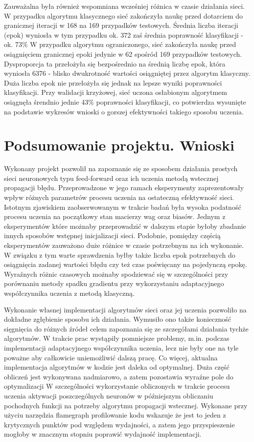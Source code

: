 \documentclass[12pt,twoside]{article}
\begin{document}
Zauważalna była również wspomniana wcześniej różnica w czasie działania sieci.
W przypadku algorytmu klasycznego sieć zakończyła naukę przed dotarciem do granicznej iteracji w 168 na 169 przypadków testowych.
Średnia liczba iteracji (epok) wyniosła w tym przypadku  ok. 372 zaś średnia poprawność klasyfikacji - ok. 73\%
W przypadku algorytmu ograniczonego, sieć zakończyła naukę przed osiągnięciem granicznej epoki jedynie w 62 spośród 169 przypadków testowych.
Dysproporcja ta przełożyła się bezpośrednio na średnią liczbę epok, która wyniosła 6376 - blisko dwukrotność wartości osiągniętej przez algorytm klasyczny.
Duża liczba epok nie przełożyła się jednak na lepsze wyniki poprawności klasyfikacji.
Przy walidacji krzyżowej, sieć uczona osłabionym algorytmem osiągnęła śrendnio  jednie 43\% poprawności klasyfikacji, co potwierdza wysunięte na podstawie wykresów wnioski o gorszej efektywności takiego sposobu uczenia.

\clearpage

\section{Podsumowanie projektu. Wnioski}
Wykonany projekt pozwolił na zapoznanie się ze sposobem działania prostych sieci neuronowych typu feed-forward oraz ich uczenia metodą  wstecznej propagacji błędu.
Przeprowadzone w jego ramach eksperymenty zaprezentowały wpływ różnych parametrów procesu uczenia na ostateczną efektywność sieci.
Istotnym zjawiskiem zaobserwowanym w trakcie badań była wysoka podatność procesu uczenia na początkowy stan macierzy wag oraz biasów.
Jednym z eksperymentów które możnaby przeprowadzić w dalszym etapie byłoby zbadanie innych sposobów wstępnej inicjalizacji sieci.
Podobnie, pomiędzy częścią eksperymentów zauważono duże różnice w czasie potrzebnym na ich wykonanie.
W związku z tym warte sprawdzenia byłby także liczba epok potrzebnych do osiągnięcia zadanej wartości błędu czy też czas poświęcany na pojedynczą epokę.
Wyraźnych różnic czasowych możnaby spodziewać się w szczególności przy porównaniu metody spadku gradientu przy wykorzystaniu adaptacyjnego współczynnika uczenia z metodą klasyczną.

Wykonanie własnej implementacji algorytmów sieci oraz jej uczenia pozwoliło na dokładne zgłębienie sposobu ich działania.
Wymusiło ono także konieczność sięgnięcia do różnych źródeł celem zapoznania się ze szczegółami działania tychże algorytmów.
W trakcie prac wystąpiły pomniejsze problemy, m.in. podczas implementacji adaptacyjnego współczynnika uczenia, lecz nie były one na tyle poważne aby całkowicie uniemożliwić dalszą pracę.
Co więcej, aktualna implementacja algorytmów w kodzie jest daleka od optymalnej.
Duża część obliczeń jest wykonywana nadmiarowo, a zatem pozostawia wyraźne pole do optymalizacji
W szczególności wykorzystanie obliczonych w trakcie procesu uczenia aktywacji poszczególnych neuronów w późniejszym obliczaniu pochodnych funkcji na potrzeby algorytmu propagacji wstecznej.
Wykonane przy użyciu narzędzia flamegraph profilowanie kodu wskazuje że jest to jeden z krytycznych punktów pod względem wydajności, a zatem jego przyspieszenie mogłoby w znacznym stopniu poprawić wydajność implementacji.
\end{document}
